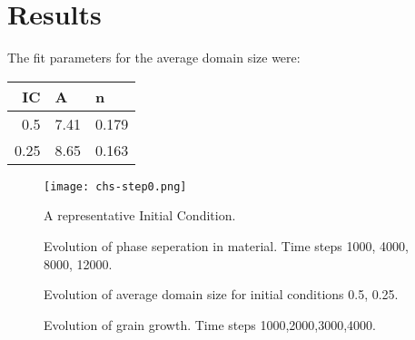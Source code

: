\documentclass{report}
\begin{document}
    \section{Results}
        The fit parameters for the average domain size were:


        \begin{tabular}[!htb]{|r|l|l|}
            \hline
            IC & A & n \\
            \hline
            0.5 & 7.41 & 0.179 \\
            \hline
            0.25 & 8.65 & 0.163 \\
            \hline

        \end{tabular}

        \begin{figure}[!htb]
            \label{fig:initial}
            \centering
            \texttt{[image: chs-step0.png]}
            \caption{A representative Initial Condition.}
        \end{figure}

        \begin{figure}[!htb]
            \label{fig:PartAevolution}
            \caption{Evolution of phase seperation in material. Time steps 1000, 4000, 8000, 12000.}
        \end{figure}

        \begin{figure}[!htb]
            \label{fig:fit}
            \caption{Evolution of average domain size for initial conditions 0.5, 0.25.}
        \end{figure}




        \begin{figure}[!htb]
            \label{fig:grain-growth}
            \caption{Evolution of grain growth. Time steps 1000,2000,3000,4000.}
        \end{figure}
\end{document}
